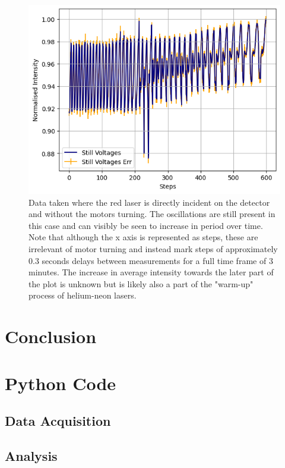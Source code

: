 \documentclass[%
reprint,
amsmath,amssymb,
aps,
]{revtex4-2}
\begin{document}
			\begin{figure}
				\includegraphics[width=0.85\columnwidth]{stillData.png}
				\caption{\label{fig:stillData}Data taken where the red laser is directly incident on the detector and without the motors turning. The oscillations are still present in this case and can visibly be seen to increase in period over time. Note that although the x axis is represented as steps, these are irrelevant of motor turning and instead mark steps of approximately 0.3 seconds delays between measurements for a full time frame of 3 minutes. The increase in average intensity towards the later part of the plot is unknown but is likely also a part of the "warm-up" process of helium-neon lasers.}
			\end{figure}

	\section{Conclusion}
		
		
	\clearpage
		
	\clearpage
	\appendix
		
	\section{Python Code}
	
		\subsection{Data Acquisition}
		
		\subsection{Analysis}
		
\end{document}
